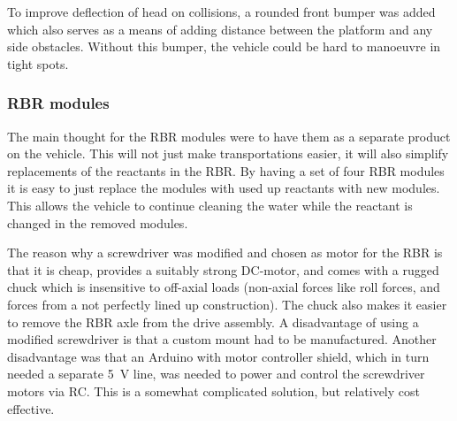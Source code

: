 To improve deflection of head on collisions, a rounded front bumper was added which also serves as a means of adding distance between the platform and any side obstacles. Without this bumper, the vehicle could be hard to manoeuvre in tight spots.

\subsubsection{RBR modules}

The main thought for the RBR modules were to have them as a separate product on the vehicle. This will not just make transportations easier, it will also simplify replacements of the reactants in the RBR. By having a set of four RBR modules it is easy to just replace the modules with used up reactants with new modules. This allows the vehicle to continue cleaning the water while the reactant is changed in the removed modules.

The reason why a screwdriver was modified and chosen as motor for the RBR is that it is cheap, provides a suitably strong DC-motor, and comes with a rugged chuck which is insensitive to off-axial loads (non-axial forces like roll forces, and forces from a not perfectly lined up construction). The chuck also makes it easier to remove the RBR axle from the drive assembly. A disadvantage of using a modified screwdriver is that a custom mount had to be manufactured. Another disadvantage was that an Arduino with motor controller shield, which in turn needed a separate 5~V line, was needed to power and control the screwdriver motors via RC. This is a somewhat complicated solution, but relatively cost effective.





